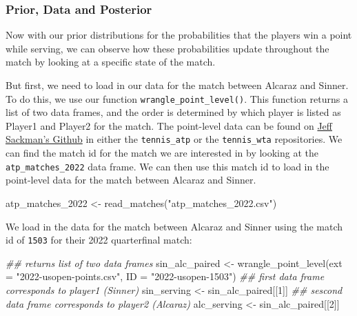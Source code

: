 \documentclass[
  letterpaper,
  DIV=11,
  numbers=noendperiod]{scrartcl}
\newenvironment{Shaded}{\begin{snugshade}}{\end{snugshade}}
\newcommand{\AttributeTok}[1]{\textcolor[rgb]{0.40,0.45,0.13}{#1}}
\newcommand{\DecValTok}[1]{\textcolor[rgb]{0.68,0.00,0.00}{#1}}
\newcommand{\DocumentationTok}[1]{\textcolor[rgb]{0.37,0.37,0.37}{\textit{#1}}}
\newcommand{\FunctionTok}[1]{\textcolor[rgb]{0.28,0.35,0.67}{#1}}
\newcommand{\NormalTok}[1]{\textcolor[rgb]{0.00,0.23,0.31}{#1}}
\newcommand{\OtherTok}[1]{\textcolor[rgb]{0.00,0.23,0.31}{#1}}
\newcommand{\StringTok}[1]{\textcolor[rgb]{0.13,0.47,0.30}{#1}}
\begin{document}
\subsubsection{Prior, Data and
Posterior}\label{prior-data-and-posterior}

Now with our prior distributions for the probabilities that the players
win a point while serving, we can observe how these probabilities update
throughout the match by looking at a specific state of the match.

But first, we need to load in our data for the match between Alcaraz and
Sinner. To do this, we use our function
\texttt{wrangle\_point\_level()}. This function returns a list of two
data frames, and the order is determined by which player is listed as
Player1 and Player2 for the match. The point-level data can be found on
\href{https://github.com/JeffSackmann}{Jeff Sackman's Github} in either
the \texttt{tennis\_atp} or the \texttt{tennis\_wta} repositories. We
can find the match id for the match we are interested in by looking at
the \texttt{atp\_matches\_2022} data frame. We can then use this match
id to load in the point-level data for the match between Alcaraz and
Sinner.

\linespread{0.9}

\begin{Shaded}
\begin{Highlighting}[]
\NormalTok{atp\_matches\_2022 }\OtherTok{\textless{}{-}} \FunctionTok{read\_matches}\NormalTok{(}\StringTok{"atp\_matches\_2022.csv"}\NormalTok{)}
\end{Highlighting}
\end{Shaded}

\linespread{2}

We load in the data for the match between Alcaraz and Sinner using the
match id of \texttt{1503} for their 2022 quarterfinal match:

\linespread{0.9}

\begin{Shaded}
\begin{Highlighting}[]
\DocumentationTok{\#\# returns list of two data frames}
\NormalTok{sin\_alc\_paired }\OtherTok{\textless{}{-}} \FunctionTok{wrangle\_point\_level}\NormalTok{(}\AttributeTok{ext =} \StringTok{"2022{-}usopen{-}points.csv"}\NormalTok{,}
                               \AttributeTok{ID =} \StringTok{"2022{-}usopen{-}1503"}\NormalTok{)}
\DocumentationTok{\#\# first data frame corresponds to player1 (Sinner)}
\NormalTok{sin\_serving }\OtherTok{\textless{}{-}}\NormalTok{ sin\_alc\_paired[[}\DecValTok{1}\NormalTok{]]}
\DocumentationTok{\#\# sescond data frame corresponds to player2 (Alcaraz)}
\NormalTok{alc\_serving }\OtherTok{\textless{}{-}}\NormalTok{ sin\_alc\_paired[[}\DecValTok{2}\NormalTok{]]}
\end{Highlighting}
\end{Shaded}
\end{document}
